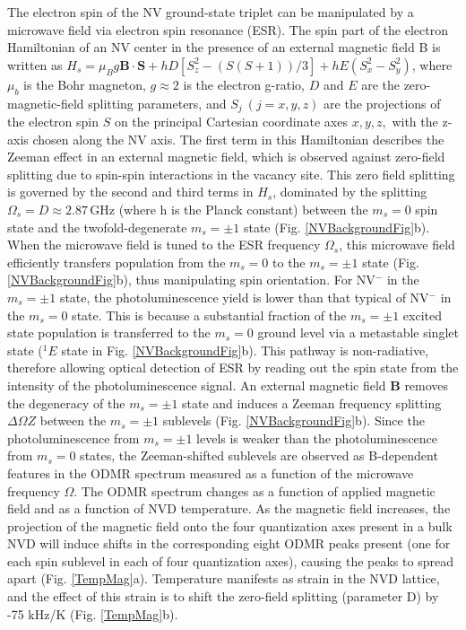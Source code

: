 \documentclass[11pt]{article}
\newcommand{\unit}[1]{\ensuremath{\, \mathrm{#1}}}
\begin{document}
The electron spin of the NV ground-state triplet can be manipulated by a microwave field via electron spin
resonance (ESR). The spin part of the electron Hamiltonian of an NV center in the presence of an external magnetic
field B is written as $H_s=\mu_B g\mathbf{B}\cdot\mathbf{S}+hD[S_z^2-(S(S+1))/3]+hE(S_x^2-S_y^2)$, where 
$\mu_b$ is the Bohr magneton, $g\approx 2$ is the electron g-ratio, $D$ and $E$ are the zero-magnetic-field
splitting parameters, and $S_j \ (j = x, y, z)$ are the projections of the electron spin $S$ on the principal
Cartesian coordinate axes $x, y, z,$ with the z-axis chosen along the NV axis. The first term in this Hamiltonian
describes the Zeeman effect in an external magnetic field, which is observed against zero-field splitting due to
spin-spin interactions in the vacancy site.  This zero field splitting is governed by the second and third terms
in $H_s$, dominated by the splitting $\Omega_s = D \approx 2.87\unit{GHz}$ (where h is the Planck constant) between the $m_s = 0$ spin state
and the twofold-degenerate $m_s = \pm1$ state (Fig. \ref{NVBackgroundFig}b).  When the microwave field is tuned to the ESR frequency $\Omega_s$,
this microwave field efficiently transfers population from the $m_s = 0$ to the $m_s = \pm1$ state (Fig. \ref{NVBackgroundFig}b), thus
manipulating spin orientation. For NV$^-$ in the $m_s = \pm1$ state, the photoluminescence yield is lower than
that typical of NV$^-$ in the $m_s = 0$ state.  This is because a substantial fraction of the $m_s = \pm1$ excited
state population is transferred to the $m_s = 0$ ground level via a metastable singlet state ($^{1}E$ state in Fig. \ref{NVBackgroundFig}b).
This pathway is non-radiative, therefore allowing optical detection of ESR by reading out the spin state from the
intensity of the photoluminescence signal. An external magnetic field $\mathbf{B}$ removes the degeneracy of the
$m_s = \pm1$ state and induces a Zeeman frequency splitting $\Delta\Omega{Z}$ between the $m_s = \pm1$ sublevels (Fig. \ref{NVBackgroundFig}b). Since the
photoluminescence from $m_s = \pm1$ levels is weaker than the photoluminescence from $m_s = 0$ states, the Zeeman-shifted
sublevels are observed as B-dependent features in the ODMR spectrum measured as a function of the microwave
frequency $\Omega$.  The ODMR spectrum changes as a function of applied magnetic field and as a function of NVD temperature.  As the magnetic field increases, the projection of the magnetic field onto the four quantization axes present in a bulk NVD will induce shifts in the corresponding eight ODMR peaks present (one for each spin sublevel in each of four quantization axes), causing the peaks to spread apart (Fig. \ref{TempMag}a).  Temperature manifests as strain in the NVD lattice, and the effect of this strain is to shift the zero-field splitting (parameter D) by -75 kHz/K (Fig. \ref{TempMag}b).
\end{document}
